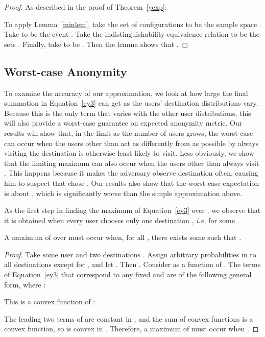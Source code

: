 \documentclass[prodmode,acmtissec]{acmsmall}
\begin{document}
\begin{theorem} \label{thm:lwrbnd}

\end{theorem}
\begin{proof}
As described in the proof of Theorem~\ref{yexp}:


To apply Lemma~\ref{minlem}, take the set of configurations  to be the sample space .  Take  to be the event .  Take the indistinguishability equivalence relation to be the sets .  Finally, take  to be .  Then the lemma shows that .
\end{proof}

\subsection{Worst-case Anonymity}
To examine the accuracy of our approximation, we look at how large the final summation in Equation~\ref{ey3} can get as the users' destination distributions vary.  Because this is the only term that varies with the other user distributions, this will also provide a worst-case guarantee on expected anonymity metric.  Our results will show that, in the limit as the number of users grows, the worst case can occur when the users other than  act as differently from  as possible by always visiting the destination  is otherwise least likely to visit.  Less obviously, we show that the limiting maximum can also occur when the users other than  always visit .  This happens because it makes the adversary observe destination  often, causing him to suspect that  chose .  Our results also show that the worst-case expectation is about , which is significantly worse than the simple approximation above.

As the first step in finding the maximum of Equation~\ref{ey3} over , we observe that it is obtained when every user  chooses only one destination , \emph{i.e.}  for some .

\begin{lemma} \label{vertex}
  A maximum of  over  must occur when, for all , there exists some  such that .
\end{lemma}
\begin{proof}
Take some user  and two destinations .  Assign arbitrary probabilities in  to all destinations except for , and let .  Then .  Consider  as a function of .  The terms  of Equation~\ref{ey3} that correspond to any fixed  and  are of the following general form, where :


This is a convex function of :


The leading two terms of  are constant in , and the sum of convex functions is a convex function, so  is convex in .  Therefore, a maximum of  must occur when .\hfill\end{proof}
\end{document}
